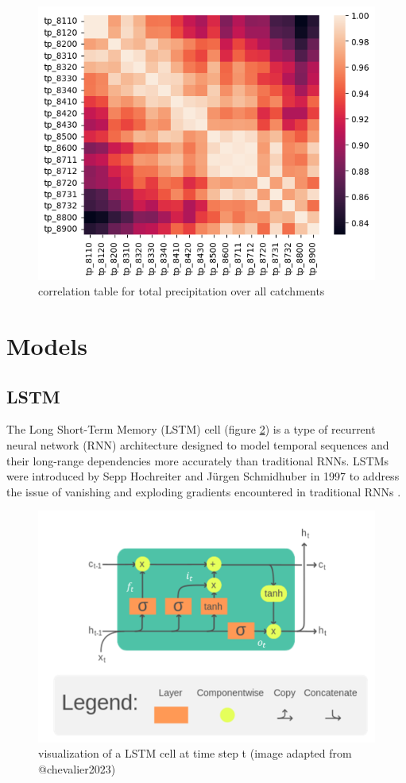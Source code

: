\documentclass[
]{krantz}
\begin{document}
\begin{figure}

{\centering \includegraphics[width=0.7\linewidth]{work/07-hydroLSTM/images/tp_correlation_table} 

}

\caption{correlation table for total precipitation over all catchments}\label{fig:tp-corr}
\end{figure}

\section{Models}\label{models}

\subsection{LSTM}\label{lstm}

The Long Short-Term Memory (LSTM) cell (figure \ref{fig:lstm}) is a type of recurrent neural network (RNN) architecture designed to model temporal sequences and their long-range dependencies more accurately than traditional RNNs. LSTMs were introduced by Sepp Hochreiter and Jürgen Schmidhuber in 1997 to address the issue of vanishing and exploding gradients encountered in traditional RNNs \citet{hochreiter1997}.

\begin{figure}

{\centering \includegraphics[width=0.7\linewidth]{work/07-hydroLSTM/images/LSTM} 

}

\caption{visualization of a LSTM cell at time step t (image adapted from @chevalier2023)}\label{fig:lstm}
\end{figure}
\end{document}
